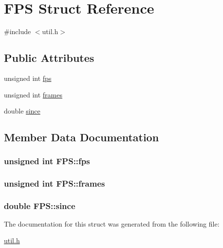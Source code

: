\hypertarget{structFPS}{}\section{F\+PS Struct Reference}
\label{structFPS}


{\ttfamily \#include $<$util.\+h$>$}

\subsection*{Public Attributes}
\begin{DoxyCompactItemize}
\item 
unsigned int \hyperlink{structFPS_ac960f6d060a8c1b0aa94b51ac695a75d}{fps}
\item 
unsigned int \hyperlink{structFPS_acc427eae0a41ee5d36a4c9bdb5149393}{frames}
\item 
double \hyperlink{structFPS_a00ae9e9c14b85585e20122a32e35000d}{since}
\end{DoxyCompactItemize}


\subsection{Member Data Documentation}
\subsubsection[{\texorpdfstring{fps}{fps}}]{\setlength{\rightskip}{0pt plus 5cm}unsigned int F\+P\+S\+::fps}\hypertarget{structFPS_ac960f6d060a8c1b0aa94b51ac695a75d}{}\label{structFPS_ac960f6d060a8c1b0aa94b51ac695a75d}
\subsubsection[{\texorpdfstring{frames}{frames}}]{\setlength{\rightskip}{0pt plus 5cm}unsigned int F\+P\+S\+::frames}\hypertarget{structFPS_acc427eae0a41ee5d36a4c9bdb5149393}{}\label{structFPS_acc427eae0a41ee5d36a4c9bdb5149393}
\subsubsection[{\texorpdfstring{since}{since}}]{\setlength{\rightskip}{0pt plus 5cm}double F\+P\+S\+::since}\hypertarget{structFPS_a00ae9e9c14b85585e20122a32e35000d}{}\label{structFPS_a00ae9e9c14b85585e20122a32e35000d}


The documentation for this struct was generated from the following file\+:\begin{DoxyCompactItemize}
\item 
\hyperlink{util_8h}{util.\+h}\end{DoxyCompactItemize}
